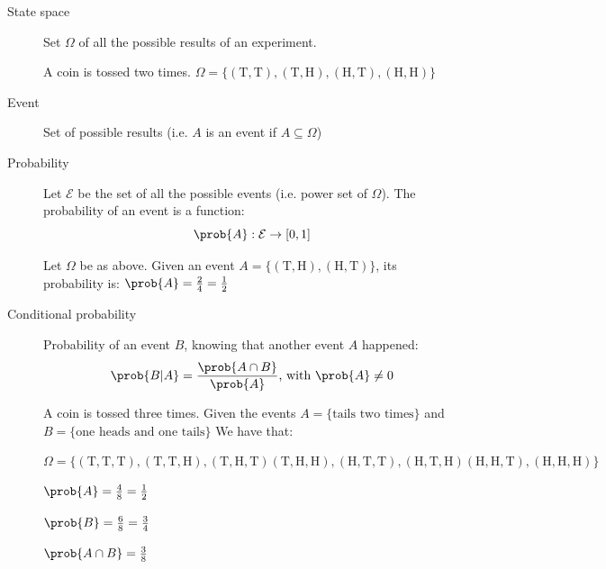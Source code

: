 \begin{description}
    \item[State space] 
        Set $\Omega$ of all the possible results of an experiment.
        \begin{example}
            A coin is tossed two times. 
            $\Omega = \{ (\text{T}, \text{T}), (\text{T}, \text{H}), (\text{H}, \text{T}), (\text{H}, \text{H}) \}$
        \end{example}

    \item[Event] 
        Set of possible results (i.e. $A$ is an event if $A \subseteq \Omega$)

    \item[Probability] 
        Let $\mathcal{E}$ be the set of all the possible events (i.e. power set of $\Omega$).
        The probability of an event is a function:
        \[ \prob{A}: \mathcal{E} \rightarrow [0, 1] \]
        \begin{example}
            Let $\Omega$ be as above.
            Given an event $A = \{ (\text{T}, \text{H}), (\text{H}, \text{T}) \}$, 
            its probability is: $\prob{A} = \frac{2}{4} = \frac{1}{2}$
        \end{example}

    \item[Conditional probability] 
        Probability of an event $B$, knowing that another event $A$ happened:
        \[ \prob{B \vert A} = \frac{\prob{A \cap B}}{\prob{A}} \text{, with } \prob{A} \neq 0 \]

        \begin{example}
            A coin is tossed three times. 
            Given the events $A = \{ \text{tails two times} \}$ and $B = \{ \text{one heads and one tails} \}$
            We have that:

            \begin{minipage}{\linewidth}
                \centering
                \small
                $\Omega = \{ 
                    (\text{T}, \text{T}, \text{T}), (\text{T}, \text{T}, \text{H}), (\text{T}, \text{H}, \text{T})
                    (\text{T}, \text{H}, \text{H}), (\text{H}, \text{T}, \text{T}), (\text{H}, \text{T}, \text{H})
                    (\text{H}, \text{H}, \text{T}), (\text{H}, \text{H}, \text{H})
                \}$
            \end{minipage}

            \begin{minipage}{.325\linewidth}
                \centering
                $\prob{A} = \frac{4}{8} = \frac{1}{2}$
            \end{minipage}
            \begin{minipage}{.325\linewidth}
                \centering
                $\prob{B} = \frac{6}{8} = \frac{3}{4}$
            \end{minipage}
            \begin{minipage}{.325\linewidth}
                \centering
                $\prob{A \cap B} = \frac{3}{8}$
            \end{minipage}


\end{example}
\end{description}
